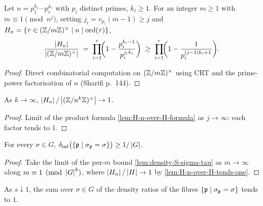 \begin{lemma}\label{lem:H-n-over-H-formula}
  Let $n = p_1^{k_1}\cdots p_r^{k_r}$ with $p_i$ distinct primes,
  $k_i\ge 1$. For an integer $m \ge 1$ with $m \equiv 1 \pmod{n^j}$,
  setting $j_i = v_{p_i}(m-1) \ge j$ and
  $H_n = \left\{ \tau\in(\mathbb{Z}/m\mathbb{Z})^\times \;\middle|\; n\mid\mathrm{ord}(\tau) \right\}$,
  \[
    \frac{\left\lvert H_n \right\rvert}{\left\lvert (\mathbb{Z}/m\mathbb{Z})^\times \right\rvert}
    \;=\; \prod_{i=1}^r\!\biggl(1-\frac{p_i^{k_i-1}}{p_i^{j_i k_i}}\biggr)
    \;\ge\; \prod_{i=1}^r\!\biggl(1-\frac{1}{p_i^{(j-1)k_i+1}}\biggr).
  \]
\end{lemma}

\begin{proof}
  Direct combinatorial computation on $(\mathbb{Z}/m\mathbb{Z})^\times$ using CRT and
  the prime-power factorisation of $n$ (Sharifi p.~144).
\end{proof}

\begin{lemma}\label{lem:H-n-over-H-tends-one}
  As $k \to \infty$,
  $\left\lvert H_n \right\rvert/\left\lvert (\mathbb{Z}/n^k\mathbb{Z})^\times \right\rvert \to 1$.
\end{lemma}

\begin{proof}
  Limit of the product formula \cref{lem:H-n-over-H-formula} as
  $j \to \infty$: each factor tends to $1$.
\end{proof}

\begin{lemma}\label{lem:liminf-ratio-ge-inv-card-G}
  For every $\sigma\in G$,
  $\delta_{\mathrm{inf}}\bigl(\left\{ \mathfrak{p} \;\middle|\; \sigma_{\mathfrak{p}} = \sigma \right\}\bigr)
  \ge 1/\left\lvert G \right\rvert$.
\end{lemma}

\begin{proof}
  Take the limit of the per-$m$ bound
  \cref{lem:density-S-sigma-tau} as $m \to \infty$ along
  $m \equiv 1\pmod{\left\lvert G \right\rvert^k}$, where $\left\lvert H_n \right\rvert/\left\lvert H \right\rvert\to 1$ by
  \cref{lem:H-n-over-H-tends-one}.
\end{proof}

\begin{lemma}\label{lem:ratiosum-fibres-tendsto-one}
  As $s\downarrow 1$, the sum over $\sigma\in G$ of the density ratios
  of the fibres $\left\{ \mathfrak{p} \;\middle|\; \sigma_{\mathfrak{p}}=\sigma \right\}$ tends to $1$.
\end{lemma}

